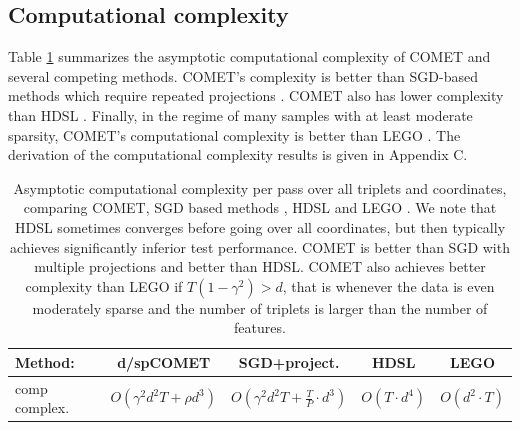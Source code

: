 \documentclass[twoside,11pt]{article}
\begin{document}
\subsection{Computational complexity}

Table \ref{comp-complx} summarizes the asymptotic computational complexity of COMET and several competing methods. COMET's complexity is better than SGD-based methods which require repeated projections \citep{OASIS, qian}. COMET also has lower complexity than HDSL \citep{hdsl}.  Finally, in the regime of many samples with at least moderate sparsity, COMET's computational complexity is better than LEGO \citep{lego}. The derivation of the computational complexity results is given in Appendix C.


\begin{table}[t]
\captionsetup{font=small}
\caption{Asymptotic computational complexity per pass over all triplets and coordinates, comparing COMET, SGD based methods \citep{OASIS, qian}, HDSL \citep{hdsl} and LEGO \citep{lego}. We note that HDSL sometimes converges before going over all coordinates, but then typically achieves significantly inferior test performance. COMET is better than SGD with multiple projections and better than HDSL. COMET also achieves better complexity than LEGO if $T(1-\gamma^2) > d$, that is whenever the data is even moderately sparse and the number of triplets is larger than the number of features.}
\label{comp-complx}
\vskip 0.15in
\begin{center}
\begin{small}
\begin{sc}
\begin{tabular}{lcccc}
\hline
Method: & d/spCOMET  & SGD+project.  & HDSL    & LEGO         \\ 
\hline
comp complex. & $O(\gamma^2 d^2 T +  \rho d^3)$&  $O(\gamma^2 d^2 T + \frac{T}{P} \cdot d^3)$
&   $O( T\cdot  d^4)$ &   $O(d^2 \cdot T)$  \\
\hline
\end{tabular}
\end{sc}
\end{small}
\end{center}
\vskip -0.1in
\end{table}
\end{document}
